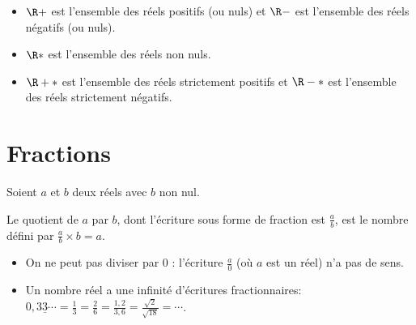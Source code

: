 \begin{ntt}
    \begin{itemize}
    \item $\R+$ est l'ensemble des réels positifs (ou nuls) et $\R-$ est l'ensemble des réels négatifs (ou nuls).
    \item $\R*$ est l'ensemble des réels non nuls.
    \item $\R+*$ est l'ensemble des réels strictement positifs et $\R-*$ est l'ensemble des réels strictement négatifs.
    \end{itemize}
\end{ntt}


%
                \section{Fractions}
%
%
%
    \begin{dfn} Soient $a$ et $b$ deux réels avec $b$ non nul.
    
    Le quotient de $a$ par $b$, dont l'écriture sous forme de fraction est $\frac{a}{b}$, est le nombre défini par     $\frac{a}{b}\times b=a$.
    \end{dfn}
%
    \begin{rmq}
            \begin{itemize}
        \item On ne peut pas diviser par $0$ : l'écriture $\frac{a}{0}$  (où $a$ est un réel) n'a pas de sens.
        \item Un nombre réel a une infinité d'écritures fractionnaires: $0,3\underline{3}\cdots=\frac13=\frac26=\frac{1,2}{3,6}=\frac{\sqrt{2}}{\sqrt{18}}=\cdots$.
        \end{itemize}
    \end{rmq}
%
